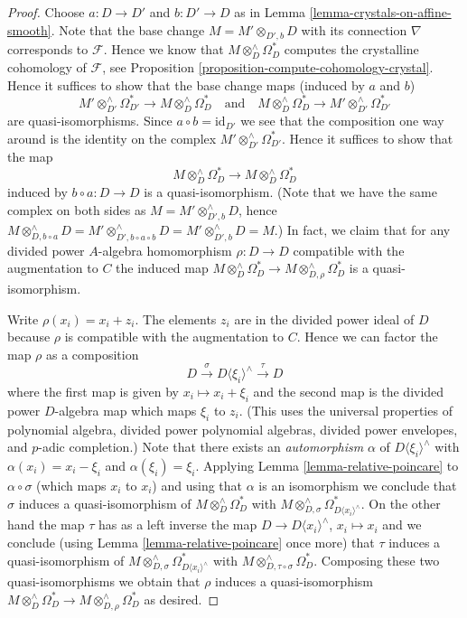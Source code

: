 \documentclass{stacks-project}
\theoremstyle{plain}
\theoremstyle{definition}
\theoremstyle{remark}
\numberwithin{equation}{subsection}
\begin{document}
\begin{proof}
Choose $a : D \to D'$ and $b : D' \to D$ as in
Lemma \ref{lemma-crystals-on-affine-smooth}.
Note that the base change $M = M' \otimes_{D', b} D$ with its
connection $\nabla$ corresponds to $\mathcal{F}$. Hence we know
that $M \otimes^\wedge_D \Omega_D^*$ computes the crystalline
cohomology of $\mathcal{F}$, see
Proposition \ref{proposition-compute-cohomology-crystal}.
Hence it suffices to show that the base change maps (induced
by $a$ and $b$)
$$
M' \otimes^\wedge_{D'} \Omega^*_{D'}
\longrightarrow
M \otimes^\wedge_D \Omega^*_D
\quad\text{and}\quad
M \otimes^\wedge_D \Omega^*_D
\longrightarrow
M' \otimes^\wedge_{D'} \Omega^*_{D'}
$$
are quasi-isomorphisms. Since $a \circ b = \text{id}_{D'}$ we see
that the composition one way around is the identity on the complex
$M' \otimes^\wedge_{D'} \Omega^*_{D'}$. Hence it suffices to show that
the map
$$
M \otimes^\wedge_D \Omega^*_D
\longrightarrow
M \otimes^\wedge_D \Omega^*_D
$$
induced by $b \circ a : D \to D$ is a quasi-isomorphism. (Note that we
have the same complex on both sides as $M = M' \otimes^\wedge_{D', b} D$,
hence $M \otimes^\wedge_{D, b \circ a} D =
M' \otimes^\wedge_{D', b \circ a \circ b} D =
M' \otimes^\wedge_{D', b} D = M$.) In fact, we claim that for any
divided power $A$-algebra homomorphism $\rho : D \to D$ compatible
with the augmentation to $C$ the induced map
$M \otimes^\wedge_D \Omega^*_D \to M \otimes^\wedge_{D, \rho} \Omega^*_D$
is a quasi-isomorphism.

\medskip\noindent
Write $\rho(x_i) = x_i + z_i$. The elements $z_i$ are in the
divided power ideal of $D$ because $\rho$ is compatible with the
augmentation to $C$. Hence we can factor the map $\rho$
as a composition
$$
D \xrightarrow{\sigma} D\langle \xi_i \rangle^\wedge \xrightarrow{\tau} D
$$
where the first map is given by $x_i \mapsto x_i + \xi_i$ and the
second map is the divided power $D$-algebra map which maps $\xi_i$ to $z_i$.
(This uses the universal properties of polynomial algebra, divided
power polynomial algebras, divided power envelopes, and $p$-adic completion.)
Note that there exists an {\it automorphism} $\alpha$ of
$D\langle \xi_i \rangle^\wedge$ with $\alpha(x_i) = x_i - \xi_i$
and $\alpha(\xi_i) = \xi_i$. Applying Lemma \ref{lemma-relative-poincare}
to $\alpha \circ \sigma$ (which maps $x_i$ to $x_i$) and using that
$\alpha$ is an isomorphism we conclude that $\sigma$ induces a
quasi-isomorphism of $M \otimes^\wedge_D \Omega^*_D$ with
$M \otimes^\wedge_{D, \sigma} \Omega^*_{D\langle x_i \rangle^\wedge}$.
On the other hand the map $\tau$ has as a left inverse the
map $D \to D\langle x_i \rangle^\wedge$, $x_i \mapsto x_i$
and we conclude (using Lemma \ref{lemma-relative-poincare} once more)
that $\tau$ induces a quasi-isomorphism of
$M \otimes^\wedge_{D, \sigma} \Omega^*_{D\langle x_i \rangle^\wedge}$
with $M \otimes^\wedge_{D, \tau \circ \sigma} \Omega^*_D$. Composing these
two quasi-isomorphisms we obtain that $\rho$ induces a quasi-isomorphism
$M \otimes^\wedge_D \Omega^*_D \to M \otimes^\wedge_{D, \rho} \Omega^*_D$
as desired.
\end{proof}
\end{document}
